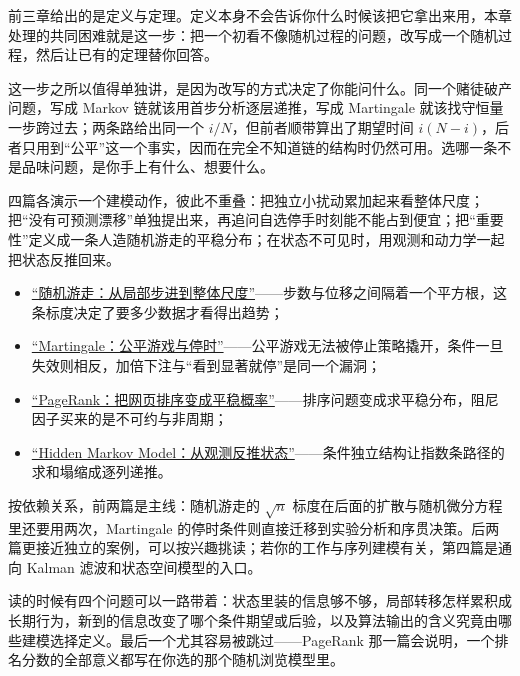 前三章给出的是定义与定理。定义本身不会告诉你什么时候该把它拿出来用，本章处理的共同困难就是这一步：把一个初看不像随机过程的问题，改写成一个随机过程，然后让已有的定理替你回答。

这一步之所以值得单独讲，是因为改写的方式决定了你能问什么。同一个赌徒破产问题，写成 Markov 链就该用首步分析逐层递推，写成 Martingale 就该找守恒量一步跨过去；两条路给出同一个 \(i/N\)，但前者顺带算出了期望时间 \(i(N-i)\)，后者只用到``公平''这一个事实，因而在完全不知道链的结构时仍然可用。选哪一条不是品味问题，是你手上有什么、想要什么。

四篇各演示一个建模动作，彼此不重叠：把独立小扰动累加起来看整体尺度；把``没有可预测漂移''单独提出来，再追问自选停手时刻能不能占到便宜；把``重要性''定义成一条人造随机游走的平稳分布；在状态不可见时，用观测和动力学一起把状态反推回来。

\begin{itemize}
\tightlist
\item \hyperref[sec:06-Random-Processes/04-Applications/01]{``随机游走：从局部步进到整体尺度''}——步数与位移之间隔着一个平方根，这条标度决定了要多少数据才看得出趋势；
\item \hyperref[sec:06-Random-Processes/04-Applications/02]{``Martingale：公平游戏与停时''}——公平游戏无法被停止策略撬开，条件一旦失效则相反，加倍下注与``看到显著就停''是同一个漏洞；
\item \hyperref[sec:06-Random-Processes/04-Applications/03]{``PageRank：把网页排序变成平稳概率''}——排序问题变成求平稳分布，阻尼因子买来的是不可约与非周期；
\item \hyperref[sec:06-Random-Processes/04-Applications/04]{``Hidden Markov Model：从观测反推状态''}——条件独立结构让指数条路径的求和塌缩成逐列递推。
\end{itemize}

按依赖关系，前两篇是主线：随机游走的 \(\sqrt n\) 标度在后面的扩散与随机微分方程里还要用两次，Martingale 的停时条件则直接迁移到实验分析和序贯决策。后两篇更接近独立的案例，可以按兴趣挑读；若你的工作与序列建模有关，第四篇是通向 Kalman 滤波和状态空间模型的入口。

读的时候有四个问题可以一路带着：状态里装的信息够不够，局部转移怎样累积成长期行为，新到的信息改变了哪个条件期望或后验，以及算法输出的含义究竟由哪些建模选择定义。最后一个尤其容易被跳过——PageRank 那一篇会说明，一个排名分数的全部意义都写在你选的那个随机浏览模型里。
